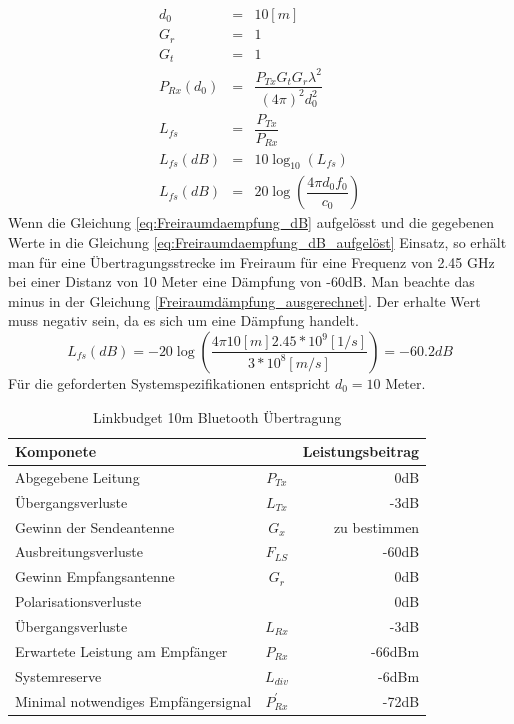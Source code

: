 \begin{eqnarray}
    	d_{0} 	&=& 10 [m] \\ \label{eq:d0_LinkBudget}
    G_r		&=&  1 \\ \label{eq:Gr_LinkBudget}
	G_t 		&=&  1 \\ \label{eq:Gt_LinkBudget}
    P_{Rx}(d_0) 	&=& \dfrac{P_{Tx}G_t G_r\lambda^2}{(4\pi)^2 d_0^2} \\ \label{eq:Prx_LinkBudget}
    L_{fs} 		&=& \dfrac{P_{Tx}}{P_{Rx}} \\ \label{eq:Freiraumdaempfung}
    L_{fs}(dB) 	&=& 10\log_{10}(L_{fs}) \\ \label{eq:Freiraumdaempfung_dB}
    L_{fs}(dB) 	&=& 20\log(\dfrac{4\pi d_0 f_0}{c_0}) \label{eq:Freiraumdaempfung_dB_aufgelöst} 
\end{eqnarray}
Wenn die Gleichung \ref{eq:Freiraumdaempfung_dB}  aufgelösst und die gegebenen Werte in die Gleichung \ref{eq:Freiraumdaempfung_dB_aufgelöst} Einsatz, so erhält man für eine Übertragungsstrecke im Freiraum für eine Frequenz von 2.45 GHz bei einer Distanz von 10 Meter eine Dämpfung von -60dB. Man beachte das minus in der Gleichung \ref{Freiraumdämpfung_ausgerechnet}. Der erhalte Wert muss negativ sein, da es sich um eine Dämpfung handelt.
\begin{equation}\label{Freiraumdämpfung_ausgerechnet}
    L_{fs}(dB) = -20\log(\dfrac{4\pi 10[m] 2.45*10^9 [1/s] }{3*10^8[m/s]}) =-60.2dB
\end{equation}
Für die geforderten Systemspezifikationen entspricht $d_0 = 10$  Meter.

\begin{table}[!ht]
  \centering
  \begin{tabular}{l c r} \toprule 
  Komponete                  	& 			&Leistungsbeitrag  \\ \midrule
  Abgegebene Leitung    			&$P_{Tx}$ 	& 0dB       \\
  Übergangsverluste              &$L_{Tx}$	& -3dB       \\
  Gewinn der Sendeantenne    	&$G_{x}$		& zu bestimmen        \\
  Ausbreitungsverluste   		& $F_{LS}$	& -60dB        \\
  Gewinn Empfangsantenne  		& $G_{r}$	& 0dB           \\
  Polarisationsverluste          & 	& 0dB            \\
  Übergangsverluste              & $L_{Rx}$	& -3dB            \\
  Erwartete Leistung am Empfänger & $P_{Rx}$  & -66dBm \cite{CC2541} \\ \midrule
  Systemreserve        			 & $L_{div}$&-6dBm \\ 
  Minimal notwendiges Empfängersignal &$P_{Rx}^{'}$ & -72dB \\ \bottomrule
  \end{tabular}
  \caption{Linkbudget 10m Bluetooth Übertragung}
  \label{tab:Linkbudget}
\end{table}

